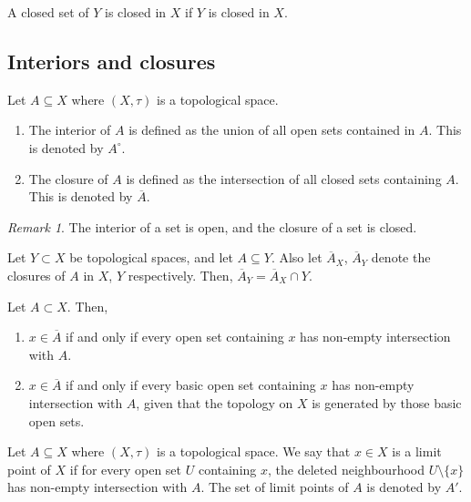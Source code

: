 \documentclass[11pt]{article}
\theoremstyle{definition}
\theoremstyle{remark}
\newtheorem*{remark}{Remark}
\numberwithin{equation}{section}
\begin{document}
    \begin{lemma}
        A closed set of $Y$ is closed in $X$ if $Y$ is closed in $X$.
    \end{lemma}

    \subsection{Interiors and closures}
    
    \begin{definition}
        Let $A \subseteq X$ where $(X, \tau)$ is a topological space. \begin{enumerate}
            \itemsep0em
            \item The interior of $A$ is defined as the union of all open sets
            contained in $A$. This is denoted by $A^\circ$.
            \item The closure of $A$ is defined as the intersection of all closed
            sets containing $A$. This is denoted by $\overline{A}$.
        \end{enumerate}
        \begin{remark}
            The interior of a set is open, and the closure of a set is closed.
        \end{remark}
    \end{definition}
    
    \begin{lemma}
        Let $Y \subset X$ be topological spaces, and let $A \subseteq Y$. Also let
        $\overline{A}_X$, $\overline{A}_Y$ denote the closures of $A$ in $X$, $Y$
        respectively. Then, $\overline{A}_Y = \overline{A}_X \cap Y$.
    \end{lemma}

    \begin{theorem}
        Let $A \subset X$. Then, \begin{enumerate}
            \itemsep0em
            \item $x \in \overline{A}$ if and only if every open set containing $x$
            has non-empty intersection with $A$.
            \item $x \in \overline{A}$ if and only if every basic open set containing
            $x$ has non-empty intersection with $A$, given that the topology on $X$
            is generated by those basic open sets.
        \end{enumerate}
    \end{theorem}


    \begin{definition}
        Let $A \subseteq X$ where $(X, \tau)$ is a topological space. We say that $x
        \in X$ is a limit point of $X$ if for every open set $U$ containing $x$, the
        deleted neighbourhood $U \setminus\{x\}$ has non-empty intersection with $A$.
        The set of limit points of $A$ is denoted by $A'$.
    \end{definition}
\end{document}
